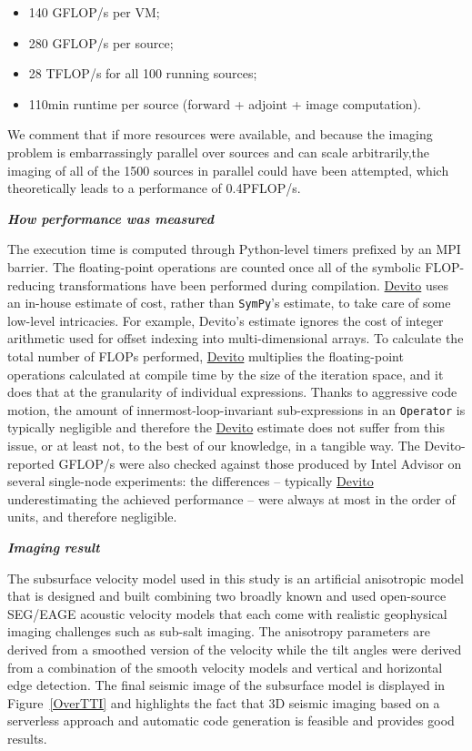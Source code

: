 \documentclass[conference]{IEEEtran}
\begin{document}
\begin{itemize}
\itemsep1pt\parskip0pt
\item
  140 GFLOP/s per VM;
\item
  280 GFLOP/s per source;
\item
  28 TFLOP/s for all 100 running sources;
\item
  110min runtime per source (forward + adjoint + image computation).
\end{itemize}

We comment that if more resources were available, and because the imaging
problem is embarrassingly parallel over sources and can scale arbitrarily,the
imaging of all of the 1500 sources in parallel could have been attempted, which
theoretically leads to a performance of 0.4PFLOP/s.

\textbf{\emph{How performance was measured}}

The execution time is computed through Python-level timers prefixed by an
MPI barrier. The floating-point operations are counted once all of the
symbolic FLOP-reducing transformations have been performed during
compilation.  \href{https://github.com/devitocodes/devito}{Devito} uses an in-house estimate of cost, rather than
\texttt{SymPy}'s estimate, to take care of some low-level intricacies. For
example, Devito's estimate ignores the cost of integer arithmetic used for
offset indexing into multi-dimensional arrays. To calculate the total
number of FLOPs performed, \href{https://github.com/devitocodes/devito}{Devito} multiplies the floating-point operations
calculated at compile time by the size of the iteration space, and it does
that at the granularity of individual expressions.  Thanks to aggressive
code motion, the amount of innermost-loop-invariant sub-expressions in an
\texttt{Operator} is typically negligible and therefore the \href{https://github.com/devitocodes/devito}{Devito} estimate
does not suffer from this issue, or at least not, to the best of our
knowledge, in a tangible way. The Devito-reported GFLOP/s were also
checked against those produced by Intel Advisor on several single-node
experiments: the differences -- typically \href{https://github.com/devitocodes/devito}{Devito} underestimating the
achieved performance -- were always at most in the order of units, and
therefore negligible.

\textbf{\emph{Imaging result}}

The subsurface velocity model used in this study is an artificial anisotropic
model that is designed and built combining two broadly known and used
open-source SEG/EAGE acoustic velocity models that each come with realistic
geophysical imaging challenges such as sub-salt imaging. The anisotropy
parameters are derived from a smoothed version of the velocity while the tilt
angles were derived from a combination of the smooth velocity models and
vertical and horizontal edge detection. The final seismic image of the
subsurface model is displayed in Figure~\ref{OverTTI} and highlights the fact
that 3D seismic imaging based on a serverless approach and automatic code
generation is feasible and provides good results.
\end{document}
